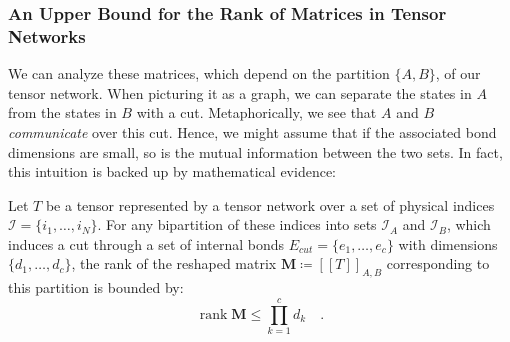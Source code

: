 \documentclass[../../main.tex]{subfiles}
\begin{document}
    

    \subsubsection{An Upper Bound for the Rank of Matrices in Tensor Networks}
    We can analyze these matrices, which depend on the partition $\{A, B\}$, of our tensor network. When picturing it as a graph, we can separate the states in $A$ from the states in $B$ with a cut. Metaphorically, we see that $A$ and $B$ \emph{communicate} over this cut. Hence, we might assume that if the associated bond dimensions are small, so is the mutual information between the two sets. In fact, this intuition is backed up by mathematical evidence:

    \begin{theorem}
    \label{theorem:min_cut_caps_rank}
Let $T$ be a tensor represented by a tensor network over a set of physical indices $\mathcal{I} = \{i_1, \dots, i_N\}$. For any bipartition of these indices into sets $\mathcal{I}_A$ and $\mathcal{I}_B$, which induces a cut through a set of internal bonds $E_{cut} = \{e_1, \dots, e_c\}$ with dimensions $\{d_1, \dots, d_c\}$, the rank of the reshaped matrix $\bm{M} \coloneqq [[T]]_{A,B}$ corresponding to this partition is bounded by:
$$
\operatorname{rank} \bm{M} \leq \prod_{k=1}^{c} d_k \quad .
$$
\end{theorem}
\end{document}
